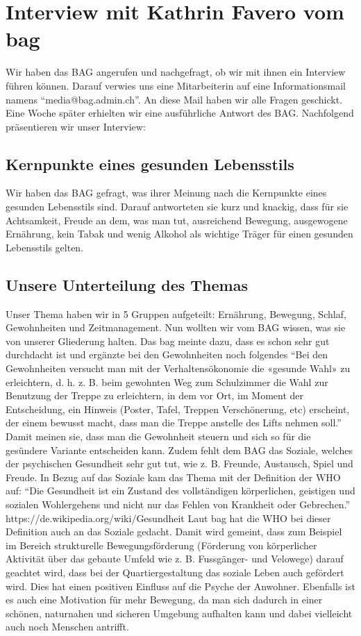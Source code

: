 \chapter{Interview mit Kathrin Favero vom \acs{bag}}
\authortoc{\bastian}{\chapterident}
Wir haben das BAG angerufen und nachgefragt, ob wir mit ihnen ein Interview führen können. Darauf verwies uns eine Mitarbeiterin auf eine Informationsmail namens “media@bag.admin.ch”. An diese Mail haben wir alle Fragen geschickt. Eine Woche später erhielten wir eine ausführliche Antwort des BAG. Nachfolgend präsentieren wir unser Interview:
\section{Kernpunkte eines gesunden Lebensstils}
Wir haben das BAG gefragt, was ihrer Meinung nach die Kernpunkte eines gesunden Lebensstils sind. Darauf antworteten sie kurz und knackig, dass für sie Achtsamkeit, Freude an dem, was man tut, ausreichend Bewegung, ausgewogene
Ernährung, kein Tabak und wenig Alkohol als wichtige Träger für einen gesunden Lebensstils gelten.
\section{Unsere Unterteilung des Themas}
Unser Thema haben wir in 5 Gruppen aufgeteilt: Ernährung, Bewegung, Schlaf, Gewohnheiten und Zeitmanagement. Nun wollten wir vom BAG wissen, was sie von unserer Gliederung halten. Das \acs{bag} meinte dazu, dass es schon sehr gut durchdacht ist und ergänzte bei den Gewohnheiten noch folgendes “Bei den Gewohnheiten versucht man mit der Verhaltensökonomie die «gesunde Wahl» zu erleichtern, d. h. z. B. beim gewohnten Weg zum Schulzimmer die Wahl zur Benutzung der Treppe zu erleichtern, in dem vor Ort, im Moment der Entscheidung, ein Hinweis (Poster, Tafel, Treppen Verschönerung, etc) erscheint, der einem bewusst macht, dass man die Treppe anstelle des Lifts nehmen soll.” Damit meinen sie, dass man die Gewohnheit steuern und sich so für die gesündere Variante entscheiden kann. Zudem fehlt dem BAG das Soziale, welches der psychischen Gesundheit sehr gut tut, wie z. B. Freunde, Austausch, Spiel und Freude.
In Bezug auf das Soziale kam das Thema mit der Definition der WHO auf: “Die Gesundheit ist ein Zustand des vollständigen körperlichen, geistigen und sozialen Wohlergehens und nicht nur das Fehlen von Krankheit oder Gebrechen.” \cite{gesundheit_definition}
https://de.wikipedia.org/wiki/Gesundheit
Laut \acs{bag} hat die WHO bei dieser Definition auch an das Soziale gedacht. Damit wird gemeint, dass zum Beispiel im Bereich strukturelle Bewegungsförderung (Förderung von körperlicher Aktivität über das gebaute Umfeld wie z. B. Fussgänger- und Velowege) darauf geachtet wird, dass bei der Quartiergestaltung das soziale Leben auch gefördert wird. Dies hat einen positiven Einfluss auf die Psyche der Anwohner. Ebenfalls ist es auch eine Motivation für mehr Bewegung, da man sich dadurch in einer schönen, naturnahen und sicheren Umgebung aufhalten kann und dabei vielleicht auch noch Menschen antrifft.
